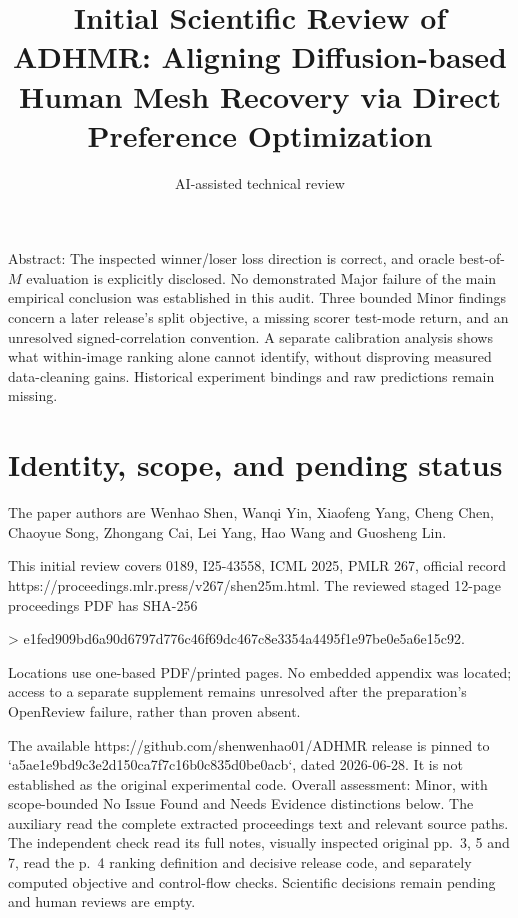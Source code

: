 \documentclass[10pt]{article}
\title{Initial Scientific Review of
ADHMR: Aligning Diffusion-based Human Mesh Recovery via Direct Preference Optimization}
\author{AI-assisted technical review}
\date{}
\begin{document}
\maketitle
Abstract: The inspected winner/loser loss direction is correct, and oracle best-of-\(M\) evaluation is explicitly disclosed. No demonstrated Major failure of the main empirical conclusion was established in this audit. Three bounded Minor findings concern a later release’s split objective, a missing scorer test-mode return, and an unresolved signed-correlation convention. A separate calibration analysis shows what within-image ranking alone cannot identify, without disproving measured data-cleaning gains. Historical experiment bindings and raw predictions remain missing.\par
\section*{Identity, scope, and pending status}
The paper authors are Wenhao Shen, Wanqi Yin, Xiaofeng Yang, Cheng Chen, Chaoyue Song, Zhongang Cai, Lei Yang, Hao Wang and Guosheng Lin.\par
This initial review covers 0189, I25-43558, ICML 2025, PMLR 267, official record https://proceedings.mlr.press/v267/shen25m.html. The reviewed staged 12-page proceedings PDF has SHA-256\par
> e1fed909bd6a90d6797d776c46f69dc467c8e3354a4495f1e97be0e5a6e15c92.\par
Locations use one-based PDF/printed pages. No embedded appendix was located; access to a separate supplement remains unresolved after the preparation’s OpenReview failure, rather than proven absent.\par
The available https://github.com/shenwenhao01/ADHMR release is pinned to `a5ae1e9bd9c3e2d150ca7f7c16b0c835d0be0acb`, dated 2026-06-28. It is not established as the original experimental code. Overall assessment: Minor, with scope-bounded No Issue Found and Needs Evidence distinctions below. The auxiliary read the complete extracted proceedings text and relevant source paths. The independent check read its full notes, visually inspected original pp. 3, 5 and 7, read the p. 4 ranking definition and decisive release code, and separately computed objective and control-flow checks. Scientific decisions remain pending and human reviews are empty.\par
\end{document}
